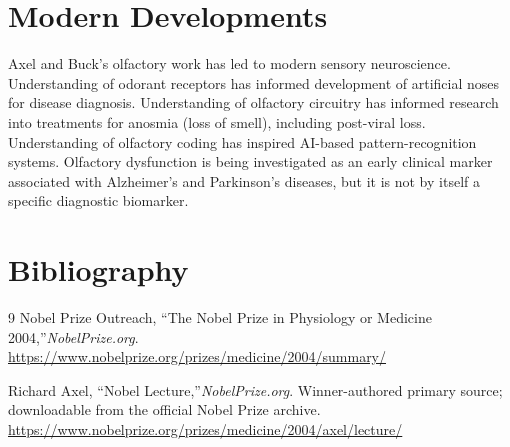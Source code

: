 \section{Modern Developments}

Axel and Buck's olfactory work has led to modern sensory neuroscience. Understanding of odorant receptors has informed development of artificial noses for disease diagnosis. Understanding of olfactory circuitry has informed research into treatments for anosmia (loss of smell), including post-viral loss. Understanding of olfactory coding has inspired AI-based pattern-recognition systems. Olfactory dysfunction is being investigated as an early clinical marker associated with Alzheimer's and Parkinson's diseases, but it is not by itself a specific diagnostic biomarker.


\section{Bibliography}

\begin{thebibliography}{9}
Nobel Prize Outreach, ``The Nobel Prize in Physiology or Medicine 2004,''\emph{NobelPrize.org}.\\
\url{https://www.nobelprize.org/prizes/medicine/2004/summary/}

Richard Axel, ``Nobel Lecture,''\emph{NobelPrize.org}. Winner-authored primary source; downloadable from the official Nobel Prize archive.\\
\url{https://www.nobelprize.org/prizes/medicine/2004/axel/lecture/}
\end{thebibliography}
